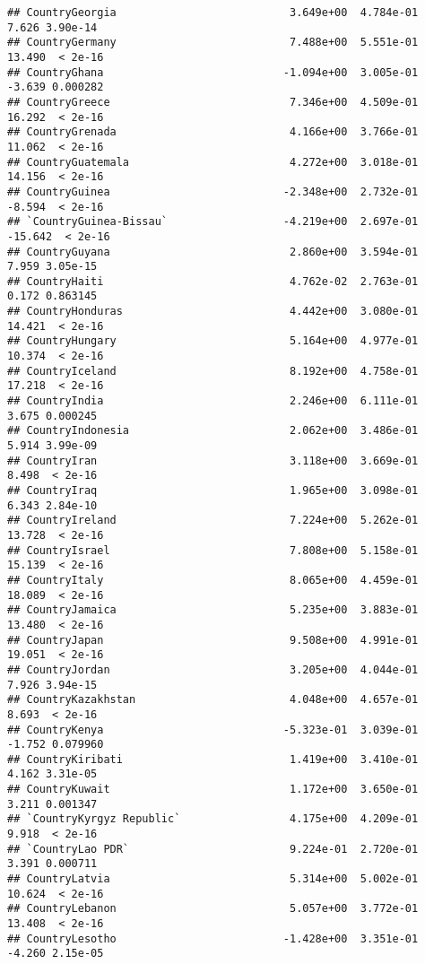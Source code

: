 \documentclass[
]{article}
\begin{document}
\begin{verbatim}
## CountryGeorgia                           3.649e+00  4.784e-01   7.626 3.90e-14
## CountryGermany                           7.488e+00  5.551e-01  13.490  < 2e-16
## CountryGhana                            -1.094e+00  3.005e-01  -3.639 0.000282
## CountryGreece                            7.346e+00  4.509e-01  16.292  < 2e-16
## CountryGrenada                           4.166e+00  3.766e-01  11.062  < 2e-16
## CountryGuatemala                         4.272e+00  3.018e-01  14.156  < 2e-16
## CountryGuinea                           -2.348e+00  2.732e-01  -8.594  < 2e-16
## `CountryGuinea-Bissau`                  -4.219e+00  2.697e-01 -15.642  < 2e-16
## CountryGuyana                            2.860e+00  3.594e-01   7.959 3.05e-15
## CountryHaiti                             4.762e-02  2.763e-01   0.172 0.863145
## CountryHonduras                          4.442e+00  3.080e-01  14.421  < 2e-16
## CountryHungary                           5.164e+00  4.977e-01  10.374  < 2e-16
## CountryIceland                           8.192e+00  4.758e-01  17.218  < 2e-16
## CountryIndia                             2.246e+00  6.111e-01   3.675 0.000245
## CountryIndonesia                         2.062e+00  3.486e-01   5.914 3.99e-09
## CountryIran                              3.118e+00  3.669e-01   8.498  < 2e-16
## CountryIraq                              1.965e+00  3.098e-01   6.343 2.84e-10
## CountryIreland                           7.224e+00  5.262e-01  13.728  < 2e-16
## CountryIsrael                            7.808e+00  5.158e-01  15.139  < 2e-16
## CountryItaly                             8.065e+00  4.459e-01  18.089  < 2e-16
## CountryJamaica                           5.235e+00  3.883e-01  13.480  < 2e-16
## CountryJapan                             9.508e+00  4.991e-01  19.051  < 2e-16
## CountryJordan                            3.205e+00  4.044e-01   7.926 3.94e-15
## CountryKazakhstan                        4.048e+00  4.657e-01   8.693  < 2e-16
## CountryKenya                            -5.323e-01  3.039e-01  -1.752 0.079960
## CountryKiribati                          1.419e+00  3.410e-01   4.162 3.31e-05
## CountryKuwait                            1.172e+00  3.650e-01   3.211 0.001347
## `CountryKyrgyz Republic`                 4.175e+00  4.209e-01   9.918  < 2e-16
## `CountryLao PDR`                         9.224e-01  2.720e-01   3.391 0.000711
## CountryLatvia                            5.314e+00  5.002e-01  10.624  < 2e-16
## CountryLebanon                           5.057e+00  3.772e-01  13.408  < 2e-16
## CountryLesotho                          -1.428e+00  3.351e-01  -4.260 2.15e-05

\end{verbatim}
\end{document}
